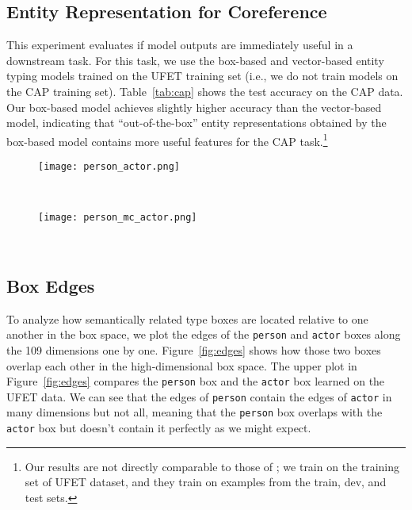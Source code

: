 \documentclass[11pt,a4paper]{article}
\begin{document}
\subsection{Entity Representation for Coreference}
This experiment evaluates if model outputs are immediately useful in a downstream task. For this task, we use the box-based and vector-based entity typing models trained on the UFET training set (i.e., we do not train models on the CAP training set). Table~\ref{tab:cap} shows the test accuracy on the CAP data. Our box-based model achieves slightly higher accuracy than the vector-based model, indicating that ``out-of-the-box'' entity representations obtained by the box-based model contains more useful features for the CAP task.\footnote{Our results are not directly comparable to those of \citet{Yasumasa_Onoe_20_Findings}; we train on the training set of UFET dataset, and they train on examples from the train, dev, and test sets.}




\begin{figure*}[t!]
\centering
\begin{subfigure}[H]{\linewidth}
\centering
  \texttt{[image: person\_actor.png]}
  \vspace{-16pt}
  \caption{}
\end{subfigure}\\
\vspace{6pt}
\begin{subfigure}[H]{\linewidth}
\centering
   \texttt{[image: person\_mc\_actor.png]}
   \vspace{-16pt}
   \caption{}
\end{subfigure}\\
\vspace{-6pt}
\caption{Edges of (a) the {\tt person} box vs the {\tt actor} box and (b) the {\tt person} box vs the minimum bounding box of the intersections between mention \& context boxes and the {\tt actor} box.}
\label{fig:edges}
\vspace{-8pt}
\end{figure*}


\subsection{Box Edges}\label{sec:box_overlaps}
To analyze how semantically related type boxes are located relative to one another in the box space, we plot the edges of the {\tt person} and {\tt actor} boxes along the 109 dimensions one by one. Figure~\ref{fig:edges} shows how those two boxes overlap each other in the high-dimensional box space. The upper plot in Figure~\ref{fig:edges} compares the {\tt person} box and the {\tt actor} box learned on the UFET data. We can see that the edges of {\tt person} contain the edges of {\tt actor} in many dimensions but not all, meaning that the {\tt person} box overlaps with the {\tt actor} box but doesn't contain it perfectly as we might expect.
\end{document}
